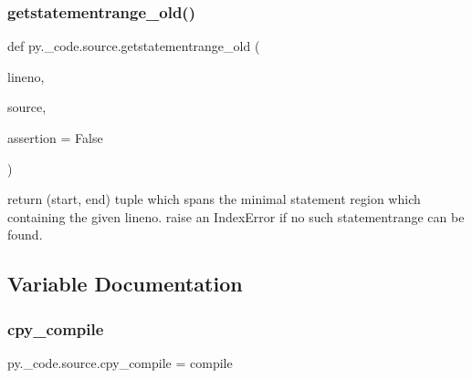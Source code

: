 \subsubsection{\texorpdfstring{getstatementrange\+\_\+old()}{getstatementrange\_old()}}
{\footnotesize\ttfamily def py.\+\_\+code.\+source.\+getstatementrange\+\_\+old (\begin{DoxyParamCaption}\item[{}]{lineno,  }\item[{}]{source,  }\item[{}]{assertion = {\ttfamily False} }\end{DoxyParamCaption})}

\begin{DoxyVerb}return (start, end) tuple which spans the minimal
    statement region which containing the given lineno.
    raise an IndexError if no such statementrange can be found.
\end{DoxyVerb}
 

\subsection{Variable Documentation}
\mbox{\label{namespacepy_1_1__code_1_1source_a1cd74262fbc8a23faf3a58accebb63de}} 
\subsubsection{\texorpdfstring{cpy\+\_\+compile}{cpy\_compile}}
{\footnotesize\ttfamily py.\+\_\+code.\+source.\+cpy\+\_\+compile = compile}

